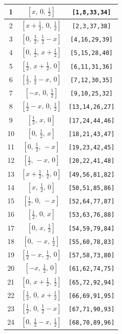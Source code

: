 \documentclass[fleqn,8pt]{jsarticle}
\begin{document}
\begin{longtable}{ccc}
1 & $\left[ x,\, 0,\, \frac{1}{2} \right]$ & {\tt [1,8,33,34]} \\ \hline
2 & $\left[ x + \frac{1}{2},\, 0,\, \frac{1}{2} \right]$ & {\tt [2,3,37,38]} \\ \hline
3 & $\left[ 0,\, \frac{1}{2},\, \frac{1}{2} - x \right]$ & {\tt [4,16,29,39]} \\ \hline
4 & $\left[ 0,\, \frac{1}{2},\, x + \frac{1}{2} \right]$ & {\tt [5,15,28,40]} \\ \hline
5 & $\left[ \frac{1}{2},\, x + \frac{1}{2},\, 0 \right]$ & {\tt [6,11,31,36]} \\ \hline
6 & $\left[ \frac{1}{2},\, \frac{1}{2} - x,\, 0 \right]$ & {\tt [7,12,30,35]} \\ \hline
7 & $\left[ - x,\, 0,\, \frac{1}{2} \right]$ & {\tt [9,10,25,32]} \\ \hline
8 & $\left[ \frac{1}{2} - x,\, 0,\, \frac{1}{2} \right]$ & {\tt [13,14,26,27]} \\ \hline
9 & $\left[ \frac{1}{2},\, x,\, 0 \right]$ & {\tt [17,24,44,46]} \\ \hline
10 & $\left[ 0,\, \frac{1}{2},\, x \right]$ & {\tt [18,21,43,47]} \\ \hline
11 & $\left[ 0,\, \frac{1}{2},\, - x \right]$ & {\tt [19,23,42,45]} \\ \hline
12 & $\left[ \frac{1}{2},\, - x,\, 0 \right]$ & {\tt [20,22,41,48]} \\ \hline
13 & $\left[ x + \frac{1}{2},\, \frac{1}{2},\, 0 \right]$ & {\tt [49,56,81,82]} \\ \hline
14 & $\left[ x,\, \frac{1}{2},\, 0 \right]$ & {\tt [50,51,85,86]} \\ \hline
15 & $\left[ \frac{1}{2},\, 0,\, - x \right]$ & {\tt [52,64,77,87]} \\ \hline
16 & $\left[ \frac{1}{2},\, 0,\, x \right]$ & {\tt [53,63,76,88]} \\ \hline
17 & $\left[ 0,\, x,\, \frac{1}{2} \right]$ & {\tt [54,59,79,84]} \\ \hline
18 & $\left[ 0,\, - x,\, \frac{1}{2} \right]$ & {\tt [55,60,78,83]} \\ \hline
19 & $\left[ \frac{1}{2} - x,\, \frac{1}{2},\, 0 \right]$ & {\tt [57,58,73,80]} \\ \hline
20 & $\left[ - x,\, \frac{1}{2},\, 0 \right]$ & {\tt [61,62,74,75]} \\ \hline
21 & $\left[ 0,\, x + \frac{1}{2},\, \frac{1}{2} \right]$ & {\tt [65,72,92,94]} \\ \hline
22 & $\left[ \frac{1}{2},\, 0,\, x + \frac{1}{2} \right]$ & {\tt [66,69,91,95]} \\ \hline
23 & $\left[ \frac{1}{2},\, 0,\, \frac{1}{2} - x \right]$ & {\tt [67,71,90,93]} \\ \hline
24 & $\left[ 0,\, \frac{1}{2} - x,\, \frac{1}{2} \right]$ & {\tt [68,70,89,96]} \\
\end{longtable}
\end{document}

